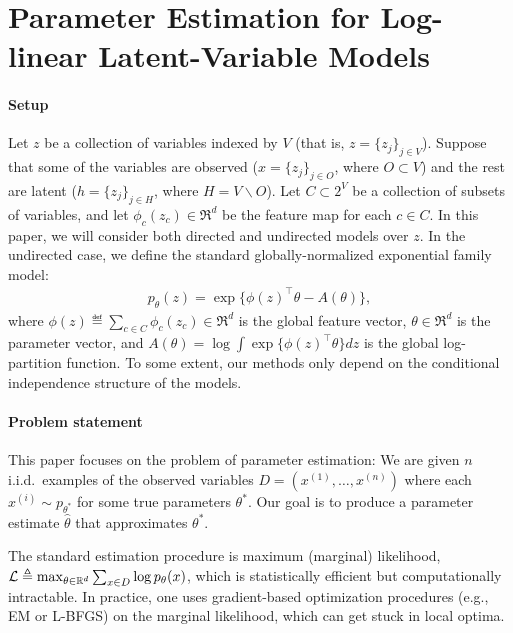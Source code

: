 \section{Parameter Estimation for Log-linear Latent-Variable Models}
\label{sec:log-linear}

\paragraph{Setup}
Let $z$ be a collection of variables indexed by $V$ (that is, $z = \{z_j\}_{j \in V}$).
Suppose that some of the variables are observed ($x = \{ z_j \}_{j \in O}$, where $O \subset V$) 
and the rest are latent ($h = \{ z_j \}_{j \in H}$, where $H = V \backslash O$).
Let $C \subset 2^V$ be a collection of subsets of variables,
and let $\phi_c(z_c) \in \Re^d$ be the feature map for each $c \in C$.
In this paper, we will consider both directed and undirected models over $z$.
In the undirected case, we define the standard globally-normalized exponential family model:
\begin{align}
  \label{eqn:undirectedSetup}
  p_\theta(z) = \exp\{ \phi(z)^\top\theta - A(\theta) \},
\end{align}
where $\phi(z) \eqdef \sum_{c \in C} \phi_c(z_c) \in \Re^d$ is the global feature vector, $\theta \in \Re^d$ is the parameter vector,
and $A(\theta) = \log \int \exp\{\phi(z)^\top\theta\} dz$ is the global log-partition function.
To some extent, our methods only depend on the conditional independence
structure of the models.

\paragraph{Problem statement}

This paper focuses on the problem of parameter estimation:
We are given $n$ i.i.d.~examples of the observed variables $D = (x^{(1)}, \dots, x^{(n)})$
where each $x^{(i)} \sim p_{\theta^*}$ for some true parameters $\theta^*$.
Our goal is to produce a parameter estimate $\hat\theta$ that approximates $\theta^*$.

The standard estimation procedure is maximum (marginal) likelihood,
$\mathcal{L} \triangleq \max_{\theta \in \mathbb{R}^d} \sum_{x \in D} \log p_\theta(x)$,
which is statistically efficient but computationally intractable.
In practice, one uses gradient-based optimization procedures (e.g., EM or L-BFGS)
on the marginal likelihood, which can get stuck in local optima.

